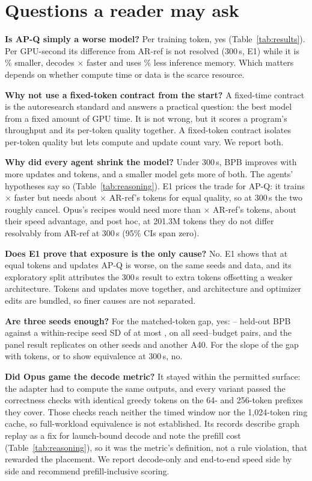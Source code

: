 \documentclass{article}
\begin{document}
\section{Questions a reader may ask}\label{app:faq}
\textbf{Is AP-Q simply a worse model?} Per training token, yes (Table~\ref{tab:results}). Per GPU-second its difference from AR-ref is not resolved (300\,s, E1) while it is \CRParamReduction\% smaller, decodes \CRDecodeRatio$\times$ faster and uses \CRMemoryReduction\% less inference memory. Which matters depends on whether compute time or data is the scarce resource.

\textbf{Why not use a fixed-token contract from the start?} A fixed-time contract is the autoresearch standard and answers a practical question: the best model from a fixed amount of GPU time. It is not wrong, but it scores a program's throughput and its per-token quality together. A fixed-token contract isolates per-token quality but lets compute and update count vary. We report both.

\textbf{Why did every agent shrink the model?} Under 300\,s, BPB improves with more updates and tokens, and a smaller model gets more of both. The agents' hypotheses say so (Table~\ref{tab:reasoning}). E1 prices the trade for AP-Q: it trains \CREOneRho$\times$ faster but needs about \CREOneK$\times$ AR-ref's tokens for equal quality, so at 300\,s the two roughly cancel. Opus's recipes would need more than \CRMTKBound$\times$ AR-ref's tokens, about their speed advantage, and post hoc, at 201.3M tokens they do not differ resolvably from AR-ref at 300\,s (95\% CIs span zero).

\textbf{Does E1 prove that exposure is the only cause?} No. E1 shows that at equal tokens and updates AP-Q is worse, on the same seeds and data, and its exploratory split attributes the 300\,s result to extra tokens offsetting a weaker architecture. Tokens and updates move together, and architecture and optimizer edits are bundled, so finer causes are not separated.

\textbf{Are three seeds enough?} For the matched-token gap, yes: \CREOneMatchedLoAbs--\CREOneMatchedHiAbs{} held-out BPB against a within-recipe seed SD of at most \CREOneMaxSD, on all \CREOnePairs{} seed--budget pairs, and the panel result replicates on other seeds and another A40. For the slope of the gap with tokens, or to show equivalence at 300\,s, no.

\textbf{Did Opus game the decode metric?} It stayed within the permitted surface: the adapter had to compute the same outputs, and every variant passed the correctness checks with identical greedy tokens on the 64- and 256-token prefixes they cover. Those checks reach neither the timed window nor the 1{,}024-token ring cache, so full-workload equivalence is not established. Its records describe graph replay as a fix for launch-bound decode and note the prefill cost (Table~\ref{tab:reasoning}), so it was the metric's definition, not a rule violation, that rewarded the placement. We report decode-only and end-to-end speed side by side and recommend prefill-inclusive scoring.
\end{document}
